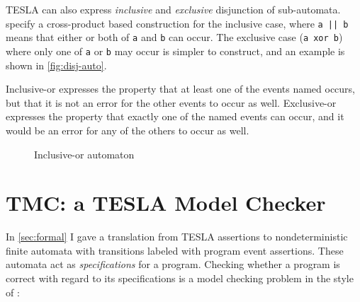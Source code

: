TESLA can also express \emph{inclusive} and \emph{exclusive} disjunction of
sub-automata. \textcite{anderson_tesla:_2014} specify a cross-product based
construction for the inclusive case, where \texttt{a || b} means that either or
both of \texttt{a} and \texttt{b} can occur. The exclusive case (\texttt{a xor
b}) where only one of \texttt{a} or \texttt{b} may occur is simpler to
construct, and an example is shown in \autoref{fig:disj-auto}.

Inclusive-or expresses the property that at least one of the events named
occurs, but that it is not an error for the other events to occur as well.
Exclusive-or expresses the property that exactly one of the named events can
occur, and it would be an error for any of the others to occur as well.

\begin{figure}
  \centering
  \caption{Inclusive-or automaton}
  \label{fig:disj-auto}
\end{figure}

\section{TMC: a TESLA Model Checker} \label{sec:checking}

In \autoref{sec:formal} I gave a translation from TESLA assertions to
nondeterministic finite automata with transitions labeled with program event
assertions. These automata act as \emph{specifications} for a program. Checking
whether a program is correct with regard to its specifications is a model
checking problem in the style of \citeauthor{clarke_design_1982}: 

